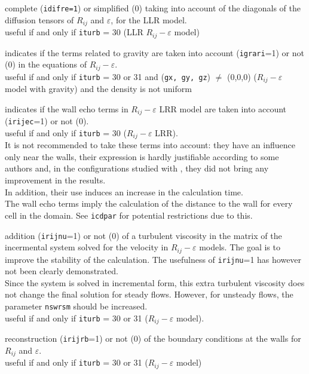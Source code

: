 {complete ({\tt idifre=1}) or simplified (0)
taking into account of the diagonals of the diffusion tensors of $R_{ij}$
and $\varepsilon$, for the LLR model.\\
useful if and only if {\tt iturb} = 30 (LLR $R_{ij}-\varepsilon$ model)}

{indicates if the terms related to gravity are
taken into account ({\tt igrari}=1) or not (0) in the equations of
$R_{ij}-\varepsilon$. \\
useful if and only if {\tt iturb} = 30 or 31 and ({\tt gx, gy, gz}) $\ne$
(0,0,0) ($R_{ij}-\varepsilon$ model with gravity) and the density is not uniform}

{indicates if the wall echo terms in
$R_{ij}-\varepsilon$ LRR model are
taken into account ({\tt irijec}=1) or not (0).\\
useful if and only if {\tt iturb} = 30 ($R_{ij}-\varepsilon$ LRR).\\
It is not recommended to take these terms into account:
they have an influence only near the walls, their expression is hardly
justifiable according to some authors and, in the configurations
studied with \CS, they did not bring any improvement in the results.\\
In addition, their use induces an increase in the calculation
time.\\
The wall echo terms imply the calculation of the distance to the wall
for every cell in the domain. See {\tt icdpar} for potential restrictions
due to this.}

{addition ({\tt irijnu}=1) or not (0) of a
turbulent viscosity in the matrix of the incermental system solved
for the velocity in $R_{ij}-\varepsilon$ models. The goal is to improve
the stability of the calculation. The usefulness of {\tt irijnu}=1 has
however not been clearly demonstrated.\\
Since the system is solved in incremental form, this extra turbulent
viscosity does not change the final solution for steady flows. However,
for unsteady flows, the parameter {\tt nswrsm} should be increased.\\
useful if and only if {\tt iturb} = 30 or 31 ($R_{ij}-\varepsilon$ model).}

{reconstruction ({\tt irijrb}=1)
or not (0) of the boundary conditions at the walls for $R_{ij}$ and  $\varepsilon$.\\
useful if and only if {\tt iturb} = 30 or 31 ($R_{ij}-\varepsilon$ model)}


